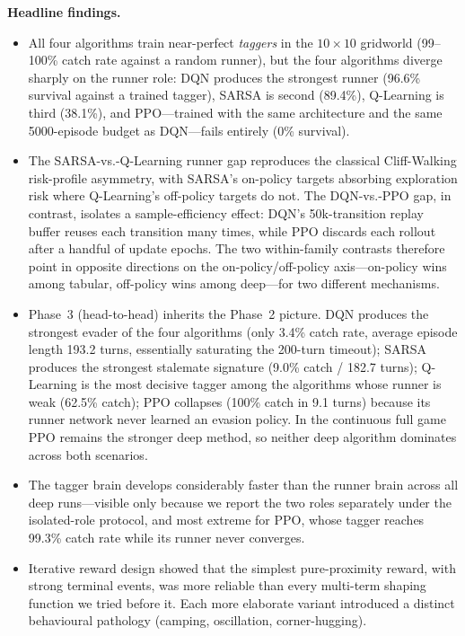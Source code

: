 \documentclass[conference]{IEEEtran}
\begin{document}
\textbf{Headline findings.}
\begin{itemize}
    \item[(a)] All four algorithms train near-perfect \emph{taggers} in
    the $10{\times}10$ gridworld (99--100\% catch rate against a random
    runner), but the four algorithms diverge sharply on the runner
    role: DQN produces the strongest runner (96.6\% survival against a
    trained tagger), SARSA is second (89.4\%), Q-Learning is third
    (38.1\%), and PPO---trained with the same architecture and the
    same 5000-episode budget as DQN---fails entirely (0\% survival).
    \item[(b)] The SARSA-vs.-Q-Learning runner gap reproduces the
    classical Cliff-Walking risk-profile asymmetry, with SARSA's
    on-policy targets absorbing exploration risk where Q-Learning's
    off-policy targets do not. The DQN-vs.-PPO gap, in contrast,
    isolates a sample-efficiency effect: DQN's 50k-transition replay
    buffer reuses each transition many times, while PPO discards each
    rollout after a handful of update epochs. The two within-family
    contrasts therefore point in opposite directions on the
    on-policy/off-policy axis---on-policy wins among tabular,
    off-policy wins among deep---for two different mechanisms.
    \item[(c)] Phase~3 (head-to-head) inherits the Phase~2 picture.
    DQN produces the strongest evader of the four algorithms (only
    3.4\% catch rate, average episode length 193.2 turns, essentially
    saturating the 200-turn timeout); SARSA produces the strongest
    stalemate signature (9.0\% catch / 182.7 turns); Q-Learning is the
    most decisive tagger among the algorithms whose runner is weak
    (62.5\% catch); PPO collapses (100\% catch in 9.1 turns) because
    its runner network never learned an evasion policy. In the
    continuous full game PPO remains the stronger deep method, so
    neither deep algorithm dominates across both scenarios.
    \item[(d)] The tagger brain develops considerably faster than the
    runner brain across all deep runs---visible only because we report
    the two roles separately under the isolated-role protocol, and
    most extreme for PPO, whose tagger reaches 99.3\% catch rate while
    its runner never converges.
    \item[(e)] Iterative reward design showed that the simplest
    pure-proximity reward, with strong terminal events, was more
    reliable than every multi-term shaping function we tried before
    it. Each more elaborate variant introduced a distinct behavioural
    pathology (camping, oscillation, corner-hugging).
\end{itemize}
\end{document}

